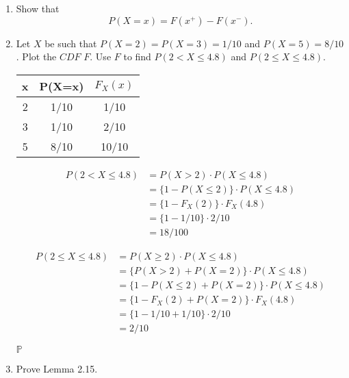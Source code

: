 \documentclass{article}
\begin{document}
\begin{enumerate}

\item Show that
  \[P(X=x)=F(x^+)-F(x^-).\]

\item Let $X$ be such that $P(X=2)=P(X=3)=1/10$ and $P(X=5)=8/10$. Plot the $CDF$ $F$.
Use $F$ to find $P(2<X\le4.8)$ and $P(2 \le X \le 4.8)$.

\begin{tabular}{c|c c}
  x & P(X=x) & $F_X(x)$ \\
  \hline
  2 & 1/10 & 1/10 \\
  3 & 1/10 & 2/10 \\
  5 & 8/10 & 10/10 \\
\end{tabular}


\begin{align*}
P(2<X\le4.8) & = P(X>2) \cdot P(X\le4.8)
\\&= \big\{1 - P(X\le2) \big\} \cdot P(X\le4.8)
\\&= \big\{1 - F_X(2) \big\} \cdot F_X(4.8)
\\&= \big\{1 - 1/10 \big\} \cdot 2/10
\\&= 18/100
\end{align*}

\begin{align*}
P(2 \le X\le4.8) & = P(X \ge 2) \cdot P(X\le4.8)
\\&= \big\{P(X>2) + P(X=2)\big\} \cdot P(X\le4.8)
\\&= \big\{ 1 - P(X\le2) + P(X=2) \big\} \cdot P(X\le4.8)
\\&= \big\{1 - F_X(2) + P(X=2)\big\} \cdot F_X(4.8)
\\&= \big\{1 - 1/10 + 1/10\big\} \cdot 2/10
\\&= 2/10
\end{align*}

$\mathbb{P}$

\item Prove Lemma 2.15.
\end{enumerate}
\end{document}
